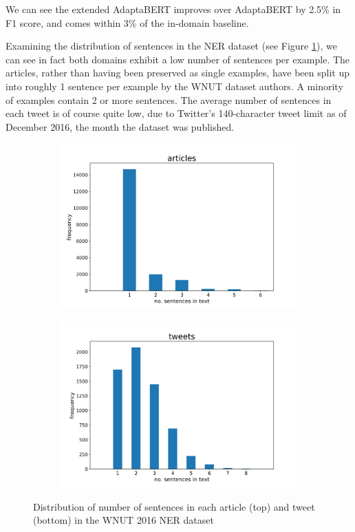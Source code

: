 We can see the extended AdaptaBERT improves over AdaptaBERT by 2.5\% in F1 score, and comes within 3\% of the in-domain baseline.

Examining the distribution of sentences in the NER dataset (see Figure \ref{fig:ner-num-sentences-distributions}), we can see in fact both domains exhibit a low number of sentences per example. The articles, rather than having been preserved as single examples, have been split up into roughly 1 sentence per example by the WNUT dataset authors. A minority of examples contain 2 or more sentences. The average number of sentences in each tweet is of course quite low, due to Twitter's 140-character tweet limit as of December 2016, the month the dataset was published.

\begin{figure}[ht]
    \centering
    \begin{subfigure}{\textwidth}
        \centering
        \includegraphics[scale=0.45]{0-img/ner-num-sentences-distribution-articles.png}
    \end{subfigure}
    \begin{subfigure}{\textwidth}
        \centering
        \includegraphics[scale=0.45]{0-img/ner-num-sentences-distribution-tweets.png}
    \end{subfigure}
    \caption{Distribution of number of sentences in each article (top) and tweet (bottom) in the WNUT 2016 NER dataset}
    \label{fig:ner-num-sentences-distributions}
\end{figure}

